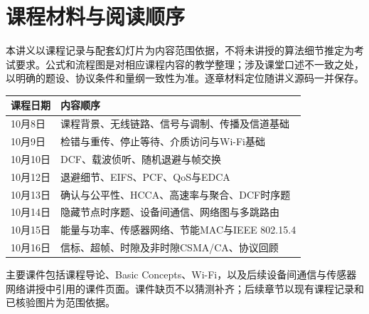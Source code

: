 \section*{课程材料与阅读顺序}
本讲义以课程记录与配套幻灯片为内容范围依据，不将未讲授的算法细节推定为考试要求。公式和流程图是对相应课程内容的教学整理；涉及课堂口述不一致之处，以明确的题设、协议条件和量纲一致性为准。逐章材料定位随讲义源码一并保存。
\begin{longtable}{p{27mm}p{124mm}}
\toprule 课程日期 & 内容顺序\\\midrule
10月8日 & 课程背景、无线链路、信号与调制、传播及信道基础\\
10月9日 & 检错与重传、停止等待、介质访问与Wi-Fi基础\\
10月10日 & DCF、载波侦听、随机退避与帧交换\\
10月12日 & 退避细节、EIFS、PCF、QoS与EDCA\\
10月13日 & 确认与公平性、HCCA、高速率与聚合、DCF时序题\\
10月14日 & 隐藏节点时序题、设备间通信、网络图与多跳路由\\
10月15日 & 能量与功率、传感器网络、节能MAC与IEEE 802.15.4\\
10月16日 & 信标、超帧、时隙及非时隙CSMA/CA、协议回顾\\\bottomrule
\end{longtable}
\noindent 主要课件包括课程导论、Basic Concepts、Wi-Fi，以及后续设备间通信与传感器网络讲授中引用的课件页面。课件缺页不以猜测补齐；后续章节以现有课程记录和已核验图片为范围依据。
